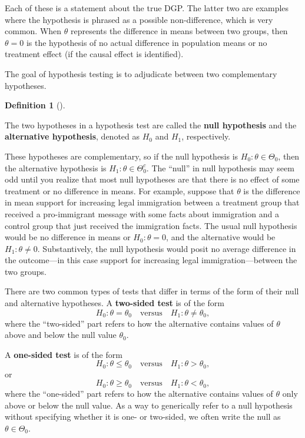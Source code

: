 \documentclass[
  13pt,
  letterpaper,
  DIV=11,
  numbers=noendperiod]{scrreprt}
\theoremstyle{plain}
\theoremstyle{plain}
\theoremstyle{definition}
\newtheorem{definition}{Definition}[chapter]
\theoremstyle{definition}
\theoremstyle{remark}
\begin{document}
Each of these is a statement about the true DGP. The latter two are
examples where the hypothesis is phrased as a possible non-difference,
which is very common. When \(\theta\) represents the difference in means
between two groups, then \(\theta = 0\) is the hypothesis of no actual
difference in population means or no treatment effect (if the causal
effect is identified).

The goal of hypothesis testing is to adjudicate between two
complementary hypotheses.

\begin{definition}[]\protect\hypertarget{def-null}{}\label{def-null}

The two hypotheses in a hypothesis test are called the \textbf{null
hypothesis} and the \textbf{alternative hypothesis}, denoted as \(H_0\)
and \(H_1\), respectively.

\end{definition}

These hypotheses are complementary, so if the null hypothesis is
\(H_0: \theta \in \Theta_0\), then the alternative hypothesis is
\(H_1: \theta \in \Theta_0^c\). The ``null'' in null hypothesis may seem
odd until you realize that most null hypotheses are that there is no
effect of some treatment or no difference in means. For example, suppose
that \(\theta\) is the difference in mean support for increasing legal
immigration between a treatment group that received a pro-immigrant
message with some facts about immigration and a control group that just
received the immigration facts. The usual null hypothesis would be no
difference in means or \(H_0: \theta = 0\), and the alternative would be
\(H_1: \theta \neq 0\). Substantively, the null hypothesis would posit
no average difference in the outcome---in this case support for
increasing legal immigration---between the two groups.

There are two common types of tests that differ in terms of the form of
their null and alternative hypotheses. A \textbf{two-sided test} is of
the form \[
H_0: \theta = \theta_0 \quad\text{versus}\quad H_1: \theta \neq \theta_0,
\] where the ``two-sided'' part refers to how the alternative contains
values of \(\theta\) above and below the null value \(\theta_0\).

A \textbf{one-sided test} is of the form \[
H_0: \theta \leq \theta_0 \quad\text{versus}\quad H_1: \theta > \theta_0,
\] or \[
H_0: \theta \geq \theta_0 \quad\text{versus}\quad H_1: \theta < \theta_0,
\] where the ``one-sided'' part refers to how the alternative contains
values of \(\theta\) only above or below the null value. As a way to
generically refer to a null hypothesis without specifying whether it is
one- or two-sided, we often write the null as \(\theta \in \Theta_0\).
\end{document}
